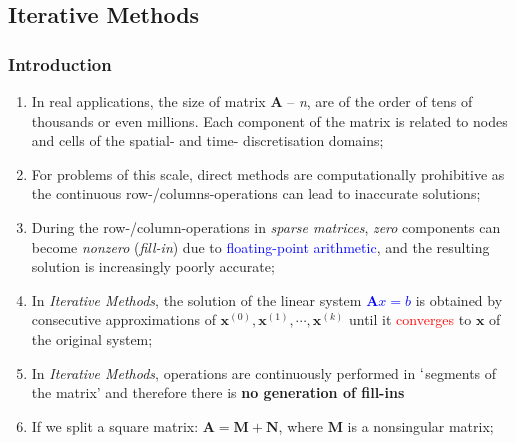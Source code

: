 \documentclass[10pt,compress]{beamer}
\begin{document}
\subsection{Iterative Methods}
\begin{frame}
  \frametitle{Introduction} 
  \begin{enumerate}
     \item <1-> In real applications, the size of matrix $\bm{A}$ -- {\it n}, are of the order of tens of thousands or even millions. Each component of the matrix is related to nodes and cells of the spatial- and time- discretisation domains;
     \item <2-> For problems of this scale, direct methods are computationally prohibitive as the continuous row-/columns-operations can lead to inaccurate solutions;
     \item <3-> During the row-/column-operations in {\it sparse matrices}, {\it zero} components can become {\it nonzero} ({\it fill-in}) due to \textcolor{blue}{floating-point arithmetic}, and the resulting solution is increasingly poorly accurate;
     \item <4-> In {\it Iterative Methods}, the solution of the linear system \textcolor{blue}{$\bm{A}x=b$} is obtained by consecutive approximations of $\bm{x}^{(0)},\bm{x}^{(1)},\cdots,\bm{x}^{(k)}$ until it \textcolor{red}{converges} to $\bm{x}$ of the original system;  
     \item <5-> In {\it Iterative Methods}, operations are continuously performed in $\lq$segments of the matrix' and therefore there is {\bf no generation of fill-ins} 
     \item <6-> If we split a square matrix: $\bm{A}=\bm{M}+\bm{N}$, where $\bm{M}$ is a nonsingular matrix;
  \end{enumerate}
\end{frame}
\end{document}
